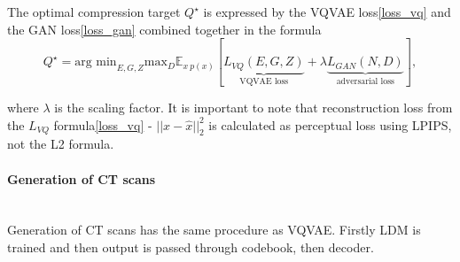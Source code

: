 The optimal compression target $Q^{\star}$ is expressed by the VQVAE loss\eqref{loss_vq} and the GAN loss\eqref{loss_gan} combined together in the formula
\begin{equation}
    Q^{\star} = \text{arg min}_{E,G,Z} \text{max}_D \mathbb{E}_{x~p(x)} [\underbrace{L_{VQ}(E, G, Z)}_{\text{VQVAE loss}} + \lambda\underbrace{L_{GAN}(N, D)}_{\text{adversarial loss}}],
\end{equation}

where $\lambda$ is the scaling factor. It is important to note that reconstruction loss from the $L_{VQ}$ formula\eqref{loss_vq} - $||x-\hat{x}||^2_2$ is calculated as perceptual loss using LPIPS, not the L2 formula. 



\paragraph{Generation of CT scans}\mbox{}\\
\indent Generation of CT scans has the same procedure as VQVAE. Firstly LDM is trained and then output is passed through codebook, then decoder. 



